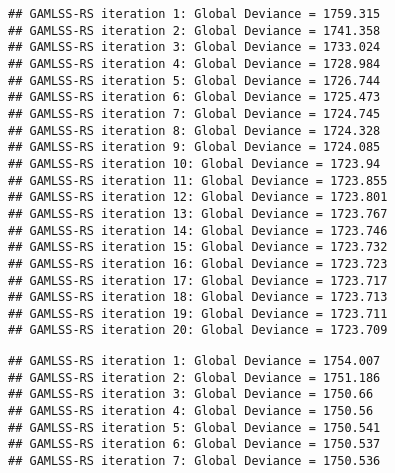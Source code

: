 \begin{verbatim}
## GAMLSS-RS iteration 1: Global Deviance = 1759.315 
## GAMLSS-RS iteration 2: Global Deviance = 1741.358 
## GAMLSS-RS iteration 3: Global Deviance = 1733.024 
## GAMLSS-RS iteration 4: Global Deviance = 1728.984 
## GAMLSS-RS iteration 5: Global Deviance = 1726.744 
## GAMLSS-RS iteration 6: Global Deviance = 1725.473 
## GAMLSS-RS iteration 7: Global Deviance = 1724.745 
## GAMLSS-RS iteration 8: Global Deviance = 1724.328 
## GAMLSS-RS iteration 9: Global Deviance = 1724.085 
## GAMLSS-RS iteration 10: Global Deviance = 1723.94 
## GAMLSS-RS iteration 11: Global Deviance = 1723.855 
## GAMLSS-RS iteration 12: Global Deviance = 1723.801 
## GAMLSS-RS iteration 13: Global Deviance = 1723.767 
## GAMLSS-RS iteration 14: Global Deviance = 1723.746 
## GAMLSS-RS iteration 15: Global Deviance = 1723.732 
## GAMLSS-RS iteration 16: Global Deviance = 1723.723 
## GAMLSS-RS iteration 17: Global Deviance = 1723.717 
## GAMLSS-RS iteration 18: Global Deviance = 1723.713 
## GAMLSS-RS iteration 19: Global Deviance = 1723.711 
## GAMLSS-RS iteration 20: Global Deviance = 1723.709
\end{verbatim}

\begin{Shaded}
\begin{Highlighting}[]
\OtherTok{\textless{}{-}} \SpecialCharTok{\textasciitilde{}} \NormalTok{, }
\end{Highlighting}
\end{Shaded}

\begin{verbatim}
## GAMLSS-RS iteration 1: Global Deviance = 1754.007 
## GAMLSS-RS iteration 2: Global Deviance = 1751.186 
## GAMLSS-RS iteration 3: Global Deviance = 1750.66 
## GAMLSS-RS iteration 4: Global Deviance = 1750.56 
## GAMLSS-RS iteration 5: Global Deviance = 1750.541 
## GAMLSS-RS iteration 6: Global Deviance = 1750.537 
## GAMLSS-RS iteration 7: Global Deviance = 1750.536
\end{verbatim}

\begin{Shaded}
\begin{Highlighting}[]
\OtherTok{\textless{}{-}} \SpecialCharTok{\textasciitilde{}} \NormalTok{, }
\end{Highlighting}
\end{Shaded}

